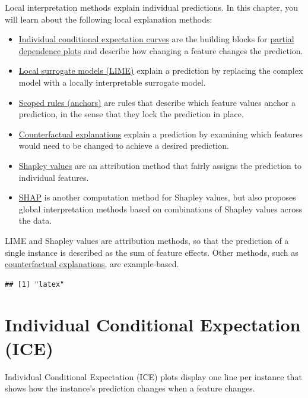 \documentclass[
  11pt,
]{scrbook}
\providecommand{\tightlist}{%
  \setlength{\itemsep}{0pt}\setlength{\parskip}{0pt}}
\begin{document}
Local interpretation methods explain individual predictions.
In this chapter, you will learn about the following local explanation methods:

\begin{itemize}
\tightlist
\item
  \protect\hyperlink{ice}{Individual conditional expectation curves} are the building blocks for \protect\hyperlink{pdp}{partial dependence plots} and describe how changing a feature changes the prediction.
\item
  \protect\hyperlink{lime}{Local surrogate models (LIME)} explain a prediction by replacing the complex model with a locally interpretable surrogate model.
\item
  \protect\hyperlink{anchors}{Scoped rules (anchors)} are rules that describe which feature values anchor a prediction, in the sense that they lock the prediction in place.
\item
  \protect\hyperlink{counterfactual}{Counterfactual explanations} explain a prediction by examining which features would need to be changed to achieve a desired prediction.
\item
  \protect\hyperlink{shapley}{Shapley values} are an attribution method that fairly assigns the prediction to individual features.
\item
  \protect\hyperlink{shap}{SHAP} is another computation method for Shapley values, but also proposes global interpretation methods based on combinations of Shapley values across the data.
\end{itemize}

LIME and Shapley values are attribution methods, so that the prediction of a single instance is described as the sum of feature effects.
Other methods, such as \protect\hyperlink{counterfactual}{counterfactual explanations}, are example-based.

\begin{verbatim}
## [1] "latex"
\end{verbatim}

\newpage

\hypertarget{ice}{%
\section{Individual Conditional Expectation (ICE)}\label{ice}}

Individual Conditional Expectation (ICE) plots display one line per instance that shows how the instance's prediction changes when a feature changes.
\end{document}
